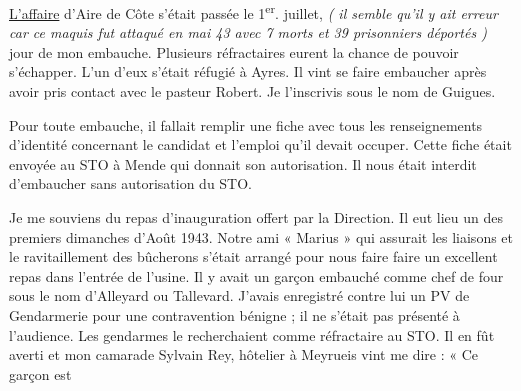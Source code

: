 \vspace{0.35cm}

\underline{L’affaire} d’Aire de Côte s’était passée le 1\textsuperscript{er}. juillet, \textit{( il semble qu’il y ait erreur car ce
maquis fut attaqué en mai 43 avec 7 morts et 39 prisonniers déportés )} jour de mon
embauche. Plusieurs réfractaires eurent la chance de pouvoir s’échapper. L’un d’eux s’était
réfugié à Ayres. Il vint se faire embaucher après avoir pris contact avec le pasteur Robert. Je
l’inscrivis sous le nom de Guigues.

\vspace{0.45cm}

Pour toute embauche, il fallait remplir une fiche avec tous les renseignements d’identité
concernant le candidat et l’emploi qu’il devait occuper. Cette fiche était envoyée au STO à
Mende qui donnait son autorisation. Il nous était interdit d’embaucher sans autorisation du
STO.

\vspace{0.45cm}

Je me souviens du repas d’inauguration offert par la Direction. Il eut lieu un des premiers
dimanches d’Août 1943. Notre ami « Marius » qui assurait les liaisons et le ravitaillement des
bûcherons s’était arrangé pour nous faire faire un excellent repas dans l’entrée de l’usine. Il y
avait un garçon embauché comme chef de four sous le nom d’Alleyard ou Tallevard. J’avais
enregistré contre lui un PV de Gendarmerie pour une contravention bénigne ; il ne s’était pas
présenté à l’audience. Les gendarmes le recherchaient comme réfractaire au STO. Il en fût
averti et mon camarade Sylvain Rey, hôtelier à Meyrueis vint me dire : « Ce garçon est
